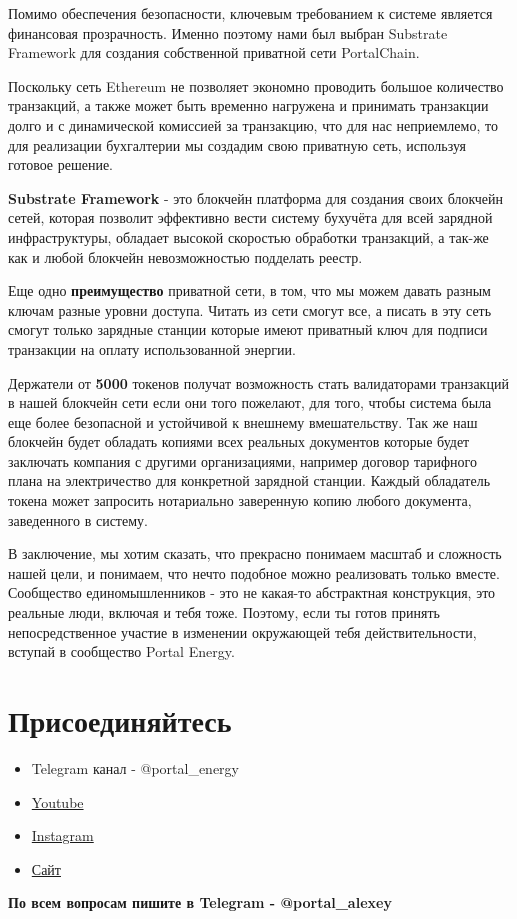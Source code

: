 \documentclass[a4paper,12pt]{report}
\begin{document}
Помимо обеспечения безопасности, ключевым требованием к системе является финансовая прозрачность.
Именно поэтому нами был выбран Substrate Framework для создания собственной приватной сети PortalChain.

Поскольку сеть Ethereum не позволяет экономно проводить большое количество транзакций, а также может быть временно нагружена и принимать транзакции долго и с динамической комиссией за транзакцию, что для нас неприемлемо, то для реализации бухгалтерии мы создадим свою приватную сеть, используя готовое решение.

\textbf{Substrate Framework} - это блокчейн платформа для создания своих блокчейн сетей, которая позволит эффективно вести систему бухучёта для всей зарядной инфраструктуры, обладает высокой скоростью обработки транзакций, а так-же как и любой блокчейн невозможностью подделать реестр.

Еще одно \textbf{преимущество} приватной сети, в том, что мы можем давать разным ключам разные уровни доступа. Читать из сети смогут все, а писать в эту сеть смогут только зарядные станции которые имеют приватный ключ для подписи транзакции на оплату использованной энергии.

Держатели от \textbf{5000} токенов получат возможность стать валидаторами транзакций в нашей блокчейн сети если они того пожелают, для того, чтобы система была еще более безопасной и устойчивой к внешнему вмешательству. Так же наш блокчейн будет обладать копиями всех реальных документов которые будет заключать компания с другими организациями, например договор тарифного плана на электричество для конкретной зарядной станции.
Каждый обладатель токена может запросить нотариально заверенную копию любого документа, заведенного в систему.

В заключение, мы хотим сказать, что прекрасно понимаем масштаб и сложность нашей цели, и понимаем, что нечто подобное можно реализовать только вместе. Сообщество единомышленников - это не какая-то абстрактная конструкция, это реальные люди, включая и тебя тоже. Поэтому, если ты готов принять непосредственное участие в изменении окружающей тебя действительности, вступай в сообщество Portal Energy.

\section{Присоединяйтесь}

\begin{itemize}
	\item Telegram канал - @portal\_energy
	\item \href{https://www.youtube.com/channel/UCtPxyCkz73i78F9HChlO61w}{Youtube}
	\item \href{https://www.instagram.com/petr_roadrunner/}{Instagram}
	\item \href{https://portalenergy.tech}{Сайт}
\end{itemize}

\textbf{По всем вопросам пишите в Telegram - @portal\_alexey}
\end{document}
